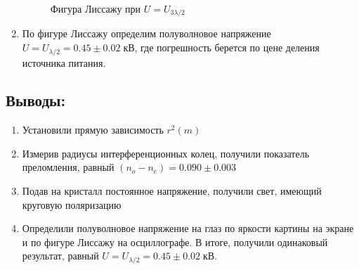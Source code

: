 \documentclass[a4paper,12pt]{article}
\begin{document}
\begin{enumerate}
\begin{figure}[h!]
\caption{Фигура Лиссажу при  $U = U_{3\lambda/2}$}
\end{figure}
\item По фигуре Лиссажу определим полуволновое напряжение $U = U_{\lambda/2} = 0.45 \pm 0.02\;\text{кВ}$, где погрешность берется по цене деления источника питания. 
\end{enumerate}
\subsection*{Выводы:}
\begin{enumerate}
\itemsep0em
\item Установили прямую зависимость $r^2(m)$
\item Измерив радиусы интерференционных колец, получили показатель преломления, равный $(n_{o}-n_{e})=0.090\pm 0.003$
\item Подав на кристалл постоянное напряжение, получили свет, имеющий круговую поляризацию
\item Определили полуволновое напряжение на глаз по яркости картины на экране и по фигуре Лиссажу на осциллографе. В итоге, получили одинаковый результат, равный $U = U_{\lambda/2} = 0.45 \pm 0.02\;\text{кВ}$. 
\end{enumerate}
\end{document}
